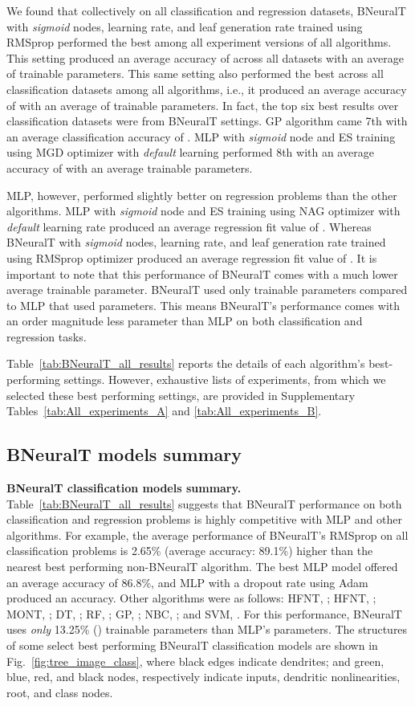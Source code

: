 \documentclass[11pt,a4paper]{article}
\begin{document}
    We found that collectively on all classification and regression datasets, BNeuralT with \textit{sigmoid} nodes,  learning rate, and  leaf generation rate trained using RMSprop  performed the best among all experiment versions of all algorithms. This setting produced an average accuracy of  across all datasets with an average of  trainable parameters. This same setting also performed the best across all classification datasets among all algorithms, i.e., it produced an average accuracy of  with an average of  trainable parameters.  In fact, the top six best results over classification datasets were from BNeuralT settings. GP algorithm came 7th with an average classification accuracy of . MLP with \textit{sigmoid} node and ES  training using MGD optimizer with \textit{default} learning performed 8th with an average accuracy of  with an average  trainable parameters.
    
    MLP, however, performed slightly better on regression problems than the other algorithms. MLP with \textit{sigmoid} node and ES training using NAG optimizer with \textit{default} learning rate produced an average regression fit value of . Whereas BNeuralT with \textit{sigmoid} nodes,  learning rate, and  leaf generation rate trained using RMSprop optimizer produced an average regression fit value of . It is important to note that this performance of BNeuralT comes with a much lower average trainable parameter. BNeuralT used only  trainable parameters compared to MLP that used  parameters. This means BNeuralT's performance comes with an order magnitude less parameter than MLP on both classification and regression tasks.
    
    Table~\ref{tab:BNeuralT_all_results} reports the details of each algorithm's best-performing settings. However, exhaustive lists of  experiments, from which we selected these best performing settings, are provided in Supplementary Tables~\ref{tab:All_experiments_A} and \ref{tab:All_experiments_B}. 
    


    \subsection{BNeuralT models summary}
    \textbf{BNeuralT classification models summary.}  
    Table~\ref{tab:BNeuralT_all_results} suggests that BNeuralT performance on both classification and regression problems is highly competitive with MLP and other algorithms. For example, the average performance of BNeuralT's RMSprop on all classification problems is 2.65\% (average accuracy: 89.1\%) higher than the nearest best performing non-BNeuralT algorithm. The best MLP model offered an average accuracy of 86.8\%, and MLP with a  dropout rate using Adam produced an  accuracy. Other algorithms were as follows: HFNT, ; HFNT, ; MONT, ; DT, ; RF, ; GP, ; NBC, ; and SVM, . For this performance, BNeuralT uses \textit{only} 13.25\% () trainable parameters than MLP's  parameters. The structures of some select best performing BNeuralT classification models are shown in Fig.~\ref{fig:tree_image_class}, where black edges indicate dendrites; and  green, blue, red, and black nodes, respectively indicate inputs, dendritic nonlinearities, root, and class nodes.
    
\end{document}
